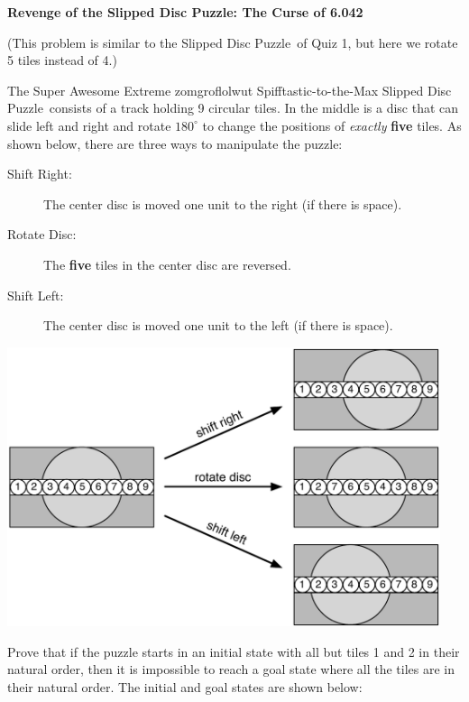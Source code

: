 \documentclass[12pt,oneside]{article}
\newcommand{\ptitle}[1]{\textbf{\hspace{0.2cm}#1}}
\begin{document}
%
\instatements{\newpage}
\begin{problem}{20}\label{slipped_disc} \ptitle{Revenge of the Slipped Disc Puzzle\texttrademark: The Curse of 6.042}

(This problem is similar to the Slipped Disc Puzzle\texttrademark\ of Quiz 1, but here we rotate 5 tiles instead of 4.)

The Super Awesome Extreme zomgroflolwut Spifftastic-to-the-Max Slipped Disc Puzzle\texttrademark\ consists of a track holding 9 
circular tiles. In the middle is a disc that can slide left and right 
and rotate 
$180^{\circ}$
to change the positions of \emph{exactly} {\bf five} tiles. As shown below, 
there are 
three ways to manipulate the puzzle:

\begin{description}
\item[Shift Right:] The center disc is moved one unit to the right (if there is space).
\item[Rotate Disc:] The {\bf five} tiles in the center disc are reversed.
\item[Shift Left:] The center disc is moved one unit to the left (if there is space).
\end{description} 

\begin{center}
\includegraphics[width=5in]{1d-puzzle-transitions-5slider.pdf}
\end{center}

Prove that if the puzzle starts in an initial state with all but tiles 1 
and 2 in their natural order, then it is impossible to reach a goal state 
where all the tiles are in their natural order.  The initial and goal states are shown below:


\end{problem}
\end{document}
